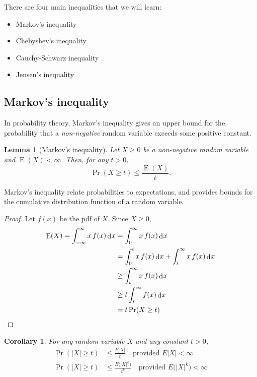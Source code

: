 \documentclass[
]{book}
\providecommand{\tightlist}{%
  \setlength{\itemsep}{0pt}\setlength{\parskip}{0pt}}
\DeclareMathOperator{\E}{E}
\DeclareMathOperator{\dd}{d}
\newcommand{\dint}{\dd\hspace{0.5pt}\!}
\newtheorem{lemma}{Lemma}[chapter]
\newtheorem{corollary}{Corollary}[chapter]
\theoremstyle{definition}
\theoremstyle{definition}
\theoremstyle{definition}
\theoremstyle{definition}
\theoremstyle{remark}
\begin{document}
There are four main inequalities that we will learn:

\begin{itemize}
\tightlist
\item
  Markov's inequality
\item
  Chebyshev's inequality
\item
  Cauchy-Schwarz inequality
\item
  Jensen's inequality
\end{itemize}

\hypertarget{markovs-inequality}{%
\subsection{Markov's inequality}\label{markovs-inequality}}

In probability theory, Markov's inequality gives an upper bound for the
probability that a \emph{non-negative} random variable exceeds some positive constant.

\begin{lemma}[Markov's inequality]
Let \(X\geq 0\) be a non-negative random variable and \(\E(X) < \infty\). Then, for any
\(t>0\), \[\Pr(X\geq t) \leq \frac{\E(X)}{t}.\]
\end{lemma}

Markov's inequality relate probabilities to expectations, and provides
bounds for the cumulative distribution function of a random variable.

\begin{proof}
Let \(f(x)\) be the pdf of \(X\). Since \(X\geq 0\), \[\begin{aligned}
    \E(X) = \int_{-\infty}^{\infty} x\,f(x) \dint x &= \int_0^{\infty} x\,f(x) \dint x \\
    &= \int_0^t x\,f(x) \dint x + \int_t^\infty x\,f(x) \dint x \\
    &\geq \int_t^\infty x\,f(x) \dint x \\
    &\geq t\int_t^\infty f(x) \dint x \\
    &= t\Pr(X\geq t) 
  \end{aligned}\]
\end{proof}

\begin{corollary}
For any random variable \(X\) and any constant \(t>0\), \[\begin{aligned}
      \Pr(|X|\geq t) &\leq \frac{E|X|}{t} \ \ \ \text{ provided } E|X|<\infty \\
      \Pr(|X|\geq t) &\leq \frac{E\big(|X|^k\big)}{t^k} \ \ \ \text{ provided } E\big(|X|^k\big)<\infty
    \end{aligned}\]
\end{corollary}
\end{document}
